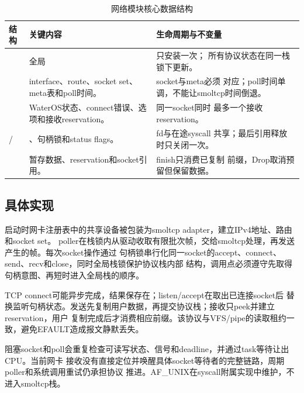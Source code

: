\begin{table}[htbp]
  \centering
  \caption{网络模块核心数据结构}
  \begin{tabularx}{\textwidth}{L{3.5cm}L{4.8cm}Y}
    \toprule
    结构 & 关键内容 & 生命周期与不变量 \\
    \midrule
     & 全局 & 只安装一次；
    所有协议状态在同一栈锁下更新。\\
     & interface、route、socket set、meta表和poll时间。 & socket与meta必须
    对应；poll时间单调，不能让smoltcp时间倒退。\\
     & WaterOS状态、connect错误、选项和接收reservation。 & 同一socket同时
    最多一个接收reservation。\\
     & 、句柄锁和status flags。 & fd与在途syscall
    共享；最后引用释放时只关闭一次。\\
     & 暂存数据、reservation和socket引用。 & finish只消费已复制
    前缀，Drop取消预留但保留数据。\\
    \bottomrule
  \end{tabularx}
\end{table}

\subsection{具体实现}

启动时网卡注册表中的共享设备被包装为smoltcp adapter，建立IPv4地址、路由和socket set。
poller在栈锁内从驱动收取有限批次帧，交给smoltcp处理，再发送产生的帧。每次socket操作通过
句柄锁串行化同一socket的accept、connect、send、recv和close，同时全局栈锁保护协议栈内部
结构，调用点必须遵守先取得句柄意图、再短时进入全局栈的顺序。

TCP connect可能异步完成，结果保存在；listen/accept在取出已连接socket后
替换监听句柄状态。发送先复制用户数据，再提交协议栈；接收只peek并建立reservation，用户
复制完成后才消费相应前缀。该协议与VFS/pipe的读取租约一致，避免EFAULT造成报文静默丢失。

阻塞socket和poll会重复检查可读写状态、信号和deadline，并通过task等待让出CPU。当前网卡
接收没有直接定位并唤醒具体socket等待者的完整链路，周期poller和系统调用重试仍承担协议
推进。AF\_UNIX在syscall附属实现中维护，不进入smoltcp栈。

